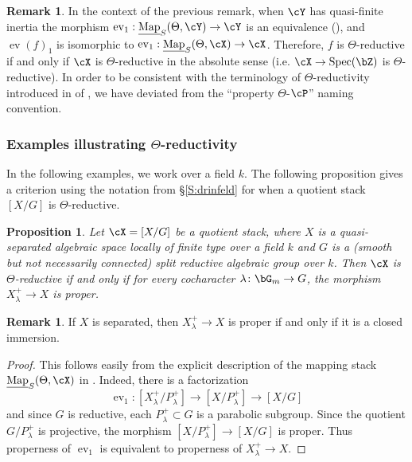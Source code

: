 \documentclass[a4paper]{amsart}
\numberwithin{equation}{section}
\theoremstyle{plain}
\newtheorem{prop}[thm]{Proposition}
\theoremstyle{definition}
\newtheorem{remark}[thm]{Remark}
\DeclareMathOperator{\Spec}{Spec}
\DeclareMathOperator{\ev}{ev}
\newcommand{\uMap}{\underline{{\rm Map}}}
\newcommand{\co}{\colon}
\begin{document}
\begin{remark} \label{R:theta-reductive-absolute}
In the context of the previous remark, when $\cY$ has quasi-finite inertia the morphism $\ev_1 : \uMap_S(\Theta,\cY) \to \cY$ is an equivalence (), and $\ev(f)_1$ is isomorphic to $\ev_1 : \uMap_S(\Theta,\cX) \to \cX$. Therefore, $f$ is $\Theta$-reductive if and only if $\cX$ is $\Theta$-reductive in the absolute sense (i.e. $\cX \to \Spec(\bZ)$ is $\Theta$-reductive). In order to be consistent with the terminology of $\Theta$-reductivity introduced in of \cite[Def.~5.1.1]{hlinstability}, we have deviated from the ``property $\Theta$-$\cP$'' naming convention.
\end{remark}

\subsubsection{Examples illustrating $\Theta$-reductivity	}
In the following examples, we work over a field $k$. The following proposition gives a criterion using the notation from \S \ref{S:drinfeld} for when a quotient stack $[X/G]$ is $\Theta$-reductive. 
\begin{prop} \label{P:quotient-theta-complete}
	Let $\cX = [X/G]$ be a quotient stack, where $X$ is a quasi-separated algebraic space locally of finite type over 
a field $k$ and $G$ is a (smooth but not necessarily connected) split reductive algebraic group over $k$.  Then $\cX$ is $\Theta$-reductive if and only if for every cocharacter $\lambda \co \bG_m \to G$, the morphism $X^+_{\lambda} \to X$ is proper.
\end{prop}

\begin{remark} If $X$ is separated, then $X^+_{\lambda} \to X$ is proper if and only if it is a closed immersion.
\end{remark}

\begin{proof}   This follows easily from the explicit description of the mapping stack $\uMap_S(\Theta,\cX)$ in .  Indeed, there is a factorization
	$$\ev_1 \co [X^+_{\lambda} / P^+_{\lambda}] \to [X / P^+_{\lambda}] \to [X/G]$$
	and since $G$ is reductive,  each $P^+_{\lambda} \subset G$ is a parabolic subgroup.  Since the quotient $G / P^+_{\lambda}$ is projective, the morphism $[X / P^+_{\lambda}] \to [X/G]$ is proper.  Thus properness of $\ev_1$ is equivalent to properness of $X^+_{\lambda} \to X$.
\end{proof}
\end{document}
